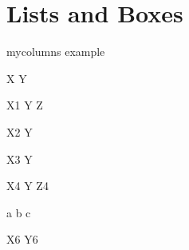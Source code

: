 \documentclass[
	aspectratio=169, %
	8pt, %
]{beamer}
\begin{document}
\section{Lists and Boxes}

\begin{frame}{mycolumns example}
\begin{mycolumns}[leftandright]
X
\mynextcolumn
Y
\end{mycolumns}
\begin{mycolumns}[leftmiddleandright]
X1
\mynextcolumn
Y
\mynextcolumn
Z
\end{mycolumns}
\begin{mycolumns}[leftthenright]
X2
\mynextcolumn
Y
\end{mycolumns}
\begin{mycolumns}[rightthenleft]
X3
\mynextcolumn
Y
\end{mycolumns}
\begin{mycolumns}[leftmiddlethenright]
X4
\mynextcolumn
Y
\mynextcolumn
Z4
\end{mycolumns}
\begin{mycolumns}[leftmiddleorright]
a
\mynextcolumn
b
\mynextcolumn
c
\end{mycolumns}
\begin{mycolumns}[leftthenright, T]
X6
\mynextcolumn
Y6
\end{mycolumns}
\end{frame}
\end{document}
